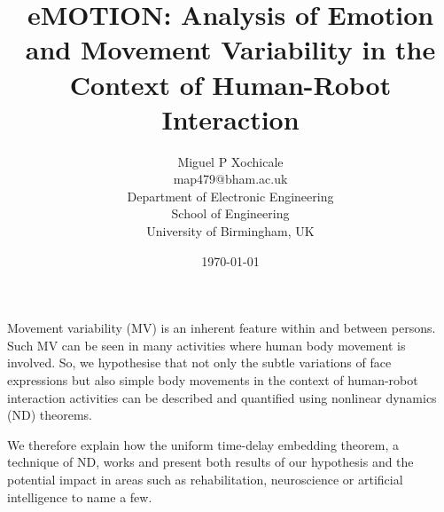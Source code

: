 \documentclass[12pt]{article}
\author{Miguel P Xochicale\\
map479@bham.ac.uk \\
Department of Electronic Engineering\\
School of Engineering\\
University of Birmingham, UK}
\title{
eMOTION: Analysis of Emotion and Movement Variability in the Context of Human-Robot Interaction
}
\date{\today}
\begin{document}
\maketitle

Movement variability (MV) is an inherent feature within and between persons.
Such MV can be seen in many activities where human body movement is involved. 
So, we hypothesise that not only the subtle 
variations of face expressions but also simple body movements 
in the context of human-robot interaction activities
can be described and quantified 
using nonlinear dynamics (ND) theorems.

We therefore explain how the uniform time-delay embedding theorem, a technique of ND, works 
and present both results of our hypothesis and the potential impact 
in areas such as 
rehabilitation, neuroscience or artificial intelligence to name a few.
\end{document}
